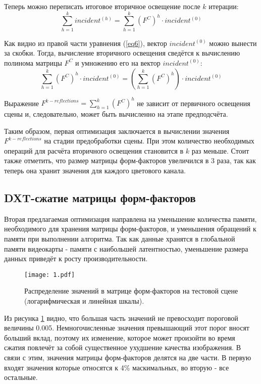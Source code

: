 \documentclass[12pt,fleqn]{article}
\begin{document}
Теперь можно переписать итоговое вторичное освещение после $k$ итерации:
\begin{equation}
\label{eq6}
\sum\limits_{h = 1}^k incident^{(h)} = \sum\limits_{h = 1}^k \left(F^C\right)^h \cdot incident^{(0)}
\end{equation}

Как видно из правой части уравнения (\ref{eq6}), вектор $incident^{(0)}$ можно вынести за скобки. Тогда, вычисление вторичного освещения сведётся к вычислению полинома матрицы $F^C$ и умножению его на вектор $incident^{(0)}$:
\begin{equation}
\label{eq7}
\sum\limits_{h = 1}^k \left(F^C\right)^h \cdot incident^{(0)} = \left(\sum\limits_{h = 1}^k \left(F^C\right)^h\right) \cdot incident^{(0)}
\end{equation}

Выражение $F^{k-reflections} = \sum\limits_{h = 1}^k \left(F^C\right)^h$ не зависит от первичного освещения сцены и, следовательно, может быть вычисленно на этапе предподсчёта.

Таким образом, первая оптимизация заключается в вычислении значения $F^{k-reflections}$ на стадии предобработки сцены. При этом количество необходимых операций для расчёта вторичного освещения становится в $k$ раз меньше. Стоит также отметить, что размер матрицы форм-факторов увеличился в 3 раза, так как теперь она хранит значения для каждого цветового канала.

\subsection{DXT-сжатие матрицы форм-факторов}

Вторая предлагаемая оптимизация направлена на уменьшение количества памяти, необходимого для хранения матрицы форм-факторов, и уменьшения обращений к памяти при выполнении алгоритма. Так как данные хранятся в глобальной памяти видеокарты - памяти с наибольшей латентностью, уменьшение размера данных приведёт к росту производительности.

\begin{figure}[htb]
    \centering
    \texttt{[image: 1.pdf]}
    \caption{Распределение значений в матрице форм-факторов на тестовой сцене (логарифмическая и линейная шкалы).}
    \label{init_distribution}
\end{figure}

Из рисунка \ref{init_distribution} видно, что большая часть значений не превосходит пороговой величины 0.005. Немногочисленные значения превышающий этот порог вносят больший вклад, поэтому их изменение, которое может произойти во время сжатия повлечёт за собой существенное ухудшение качества изображения. В связи с этим, значения матрицы форм-факторов делятся на две части. В первую входят значения которые относятся к 4\% маскимальных, во вторую - все остальные.
\end{document}
